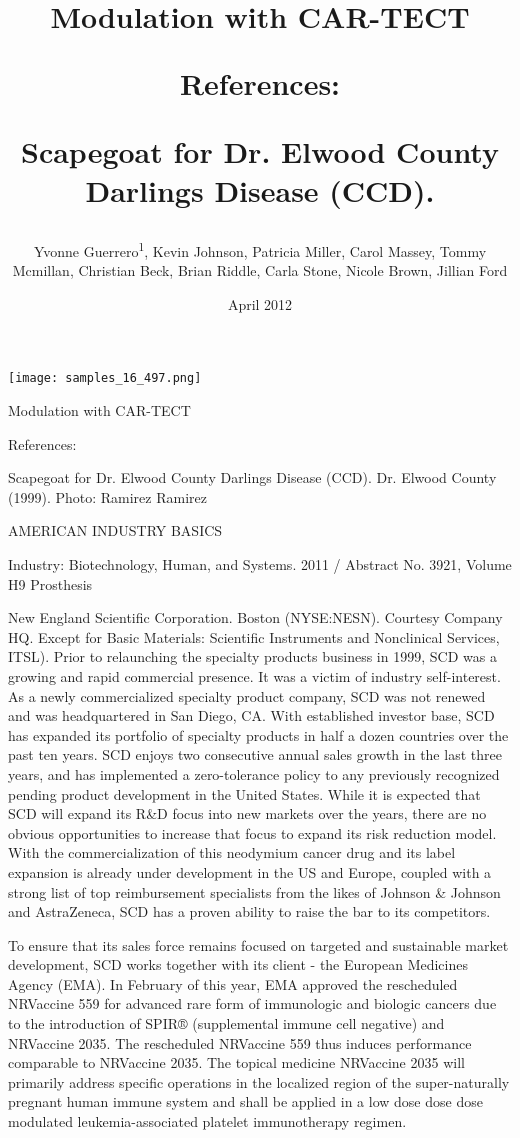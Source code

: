 \documentclass{article}
\title{Modulation with CAR-TECT

References:

Scapegoat for Dr. Elwood County Darlings Disease (CCD).}
\author{Yvonne Guerrero\textsuperscript{1},  Kevin Johnson,  Patricia Miller,  Carol Massey,  Tommy Mcmillan,  Christian Beck,  Brian Riddle,  Carla Stone,  Nicole Brown,  Jillian Ford}
\affil{\textsuperscript{1}Leiden University}
\date{April 2012}
\begin{document}
\maketitle

\begin{center}
\begin{minipage}{0.75\linewidth}
\texttt{[image: samples\_16\_497.png]}
\end{minipage}
\end{center}

Modulation with CAR-TECT

References:

Scapegoat for Dr. Elwood County Darlings Disease (CCD). Dr. Elwood County (1999). Photo: Ramirez Ramirez

AMERICAN INDUSTRY BASICS

Industry: Biotechnology, Human, and Systems. 2011 / Abstract No. 3921, Volume H9 Prosthesis

New England Scientific Corporation. Boston (NYSE:NESN). Courtesy Company HQ. Except for Basic Materials: Scientific Instruments and Nonclinical Services, ITSL). Prior to relaunching the specialty products business in 1999, SCD was a growing and rapid commercial presence. It was a victim of industry self-interest. As a newly commercialized specialty product company, SCD was not renewed and was headquartered in San Diego, CA. With established investor base, SCD has expanded its portfolio of specialty products in half a dozen countries over the past ten years. SCD enjoys two consecutive annual sales growth in the last three years, and has implemented a zero-tolerance policy to any previously recognized pending product development in the United States. While it is expected that SCD will expand its R\&D focus into new markets over the years, there are no obvious opportunities to increase that focus to expand its risk reduction model. With the commercialization of this neodymium cancer drug and its label expansion is already under development in the US and Europe, coupled with a strong list of top reimbursement specialists from the likes of Johnson \& Johnson and AstraZeneca, SCD has a proven ability to raise the bar to its competitors.

To ensure that its sales force remains focused on targeted and sustainable market development, SCD works together with its client - the European Medicines Agency (EMA). In February of this year, EMA approved the rescheduled NRVaccine 559 for advanced rare form of immunologic and biologic cancers due to the introduction of SPIR® (supplemental immune cell negative) and NRVaccine 2035. The rescheduled NRVaccine 559 thus induces performance comparable to NRVaccine 2035. The topical medicine NRVaccine 2035 will primarily address specific operations in the localized region of the super-naturally pregnant human immune system and shall be applied in a low dose dose dose modulated leukemia-associated platelet immunotherapy regimen.
\end{document}
